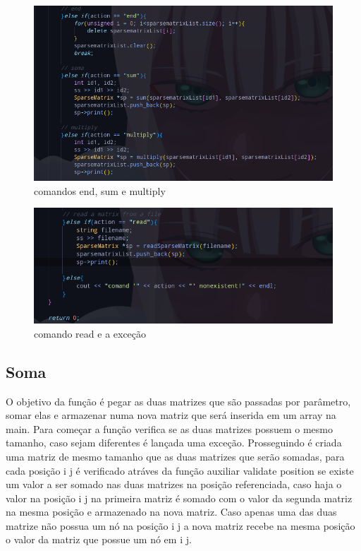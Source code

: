 \documentclass[a4paper,12pt]{article}
\begin{document}
\begin{figure}[H]
\centering
\includegraphics[width=1\textwidth]{Imagens/main/main-comandos-pt3.png}
\caption{\label{fig:endtomult} comandos end, sum e multiply}
\end{figure}

\begin{figure}[H]
\centering
\includegraphics[width=1\textwidth]{Imagens/main/main-comandos-pt4.png}
\caption{\label{fig:readandelse} comando read e a exceção}
\end{figure}


\subsection{Soma}
O objetivo da função é pegar as duas matrizes que são passadas por parâmetro, somar elas e armazenar numa nova matriz que será inserida em um array na main.
Para começar a função verifica se as duas matrizes possuem o mesmo tamanho, caso sejam diferentes é lançada uma exceção.
Prosseguindo é criada uma matriz de mesmo tamanho que as duas matrizes que serão somadas, para cada posição i j é verificado atráves da função auxiliar validate position se existe um valor a ser somado nas duas matrizes na posição referenciada, caso haja o valor na posição i j na primeira matriz é somado com o valor da segunda matriz na mesma posição e armazenado na nova matriz. Caso apenas uma das duas matrize não possua um nó na posição i j a nova matriz recebe na mesma posição o valor da matriz que possue um nó em i j. 
\end{document}
